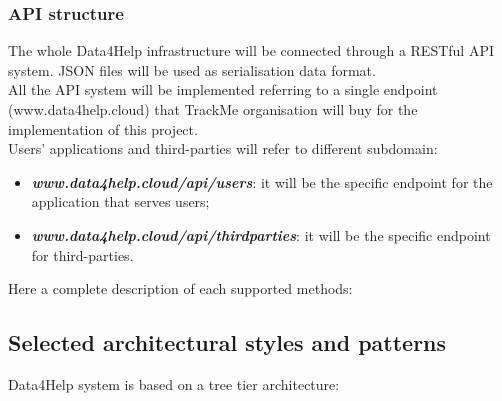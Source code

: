 \documentclass[DD.tex]{subfiles}
\begin{document}
\newpage

\subsubsection{API structure}
The whole Data4Help infrastructure will be connected through a RESTful API system. JSON files will be used as serialisation data format.\\
All the API system will be implemented referring to a single endpoint (www.data4help.cloud) that TrackMe organisation will buy for the implementation of this project.
\\Users' applications and third-parties will refer to different subdomain:

\begin{itemize}
	\item \textit{\textbf{www.data4help.cloud/api/users}}: it will be the specific endpoint for the application that serves users;
	\item \textit{\textbf{www.data4help.cloud/api/thirdparties}}: it will be the specific endpoint for third-parties.
\end{itemize}

Here a complete description of each supported methods:

\newpage
\subsection{Selected architectural styles and patterns}
Data4Help system is based on a tree tier architecture:
\end{document}
